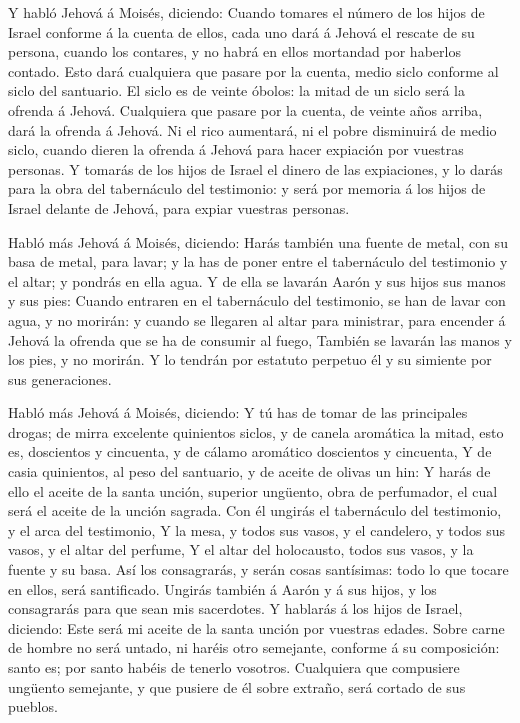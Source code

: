 Y habló Jehová á Moisés, diciendo:  Cuando
tomares el número de los hijos de Israel conforme á la cuenta de ellos,
cada uno dará á Jehová el rescate de su persona, cuando los contares, y
no habrá en ellos mortandad por haberlos contado.  Esto
dará cualquiera que pasare por la cuenta, medio siclo conforme al siclo
del santuario. El siclo es de veinte óbolos: la mitad de un siclo será
la ofrenda á Jehová.  Cualquiera que pasare por la cuenta,
de veinte años arriba, dará la ofrenda á Jehová.  Ni el
rico aumentará, ni el pobre disminuirá de medio siclo, cuando dieren la
ofrenda á Jehová para hacer expiación por vuestras personas.
 Y tomarás de los hijos de Israel el dinero de las
expiaciones, y lo darás para la obra del tabernáculo del testimonio: y
será por memoria á los hijos de Israel delante de Jehová, para expiar
vuestras personas.

 Habló más Jehová á Moisés, diciendo:  Harás
también una fuente de metal, con su basa de metal, para lavar; y la has
de poner entre el tabernáculo del testimonio y el altar; y pondrás en
ella agua.  Y de ella se lavarán Aarón y sus hijos sus
manos y sus pies:  Cuando entraren en el tabernáculo del
testimonio, se han de lavar con agua, y no morirán: y cuando se llegaren
al altar para ministrar, para encender á Jehová la ofrenda que se ha de
consumir al fuego,  También se lavarán las manos y los
pies, y no morirán. Y lo tendrán por estatuto perpetuo él y su simiente
por sus generaciones.

 Habló más Jehová á Moisés, diciendo:  Y tú
has de tomar de las principales drogas; de mirra excelente quinientos
siclos, y de canela aromática la mitad, esto es, doscientos y cincuenta,
y de cálamo aromático doscientos y cincuenta,  Y de casia
quinientos, al peso del santuario, y de aceite de olivas un hin:
 Y harás de ello el aceite de la santa unción, superior
ungüento, obra de perfumador, el cual será el aceite de la unción
sagrada.  Con él ungirás el tabernáculo del testimonio, y
el arca del testimonio,  Y la mesa, y todos sus vasos, y el
candelero, y todos sus vasos, y el altar del perfume,  Y el
altar del holocausto, todos sus vasos, y la fuente y su basa.
 Así los consagrarás, y serán cosas santísimas: todo lo que
tocare en ellos, será santificado.  Ungirás también á Aarón
y á sus hijos, y los consagrarás para que sean mis sacerdotes.
 Y hablarás á los hijos de Israel, diciendo: Este será mi
aceite de la santa unción por vuestras edades.  Sobre carne
de hombre no será untado, ni haréis otro semejante, conforme á su
composición: santo es; por santo habéis de tenerlo vosotros.
 Cualquiera que compusiere ungüento semejante, y que
pusiere de él sobre extraño, será cortado de sus pueblos.

